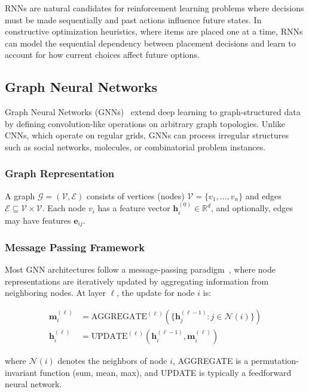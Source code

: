 RNNs are natural candidates for reinforcement learning problems where decisions must be made sequentially and past actions influence future states. In constructive optimization heuristics, where items are placed one at a time, RNNs can model the sequential dependency between placement decisions and learn to account for how current choices affect future options.

\subsection{Graph Neural Networks}

Graph Neural Networks (GNNs)~\cite{scarselli2009graph} extend deep learning to graph-structured data by defining convolution-like operations on arbitrary graph topologies. Unlike CNNs, which operate on regular grids, GNNs can process irregular structures such as social networks, molecules, or combinatorial problem instances.

\subsubsection{Graph Representation}

A graph $\mathcal{G} = (\mathcal{V}, \mathcal{E})$ consists of vertices (nodes) $\mathcal{V} = \{v_1, \ldots, v_n\}$ and edges $\mathcal{E} \subseteq \mathcal{V} \times \mathcal{V}$. Each node $v_i$ has a feature vector $\mathbf{h}_i^{(0)} \in \mathbb{R}^d$, and optionally, edges may have features $\mathbf{e}_{ij}$.

\subsubsection{Message Passing Framework}

Most GNN architectures follow a message-passing paradigm~\cite{gilmer2017neural}, where node representations are iteratively updated by aggregating information from neighboring nodes. At layer $\ell$, the update for node $i$ is:

\begin{align}
\mathbf{m}_i^{(\ell)} &= \text{AGGREGATE}^{(\ell)}\left(\{\mathbf{h}_j^{(\ell-1)} : j \in \mathcal{N}(i)\}\right) \\
\mathbf{h}_i^{(\ell)} &= \text{UPDATE}^{(\ell)}\left(\mathbf{h}_i^{(\ell-1)}, \mathbf{m}_i^{(\ell)}\right)
\end{align}

where $\mathcal{N}(i)$ denotes the neighbors of node $i$, AGGREGATE is a permutation-invariant function (sum, mean, max), and UPDATE is typically a feedforward neural network.

